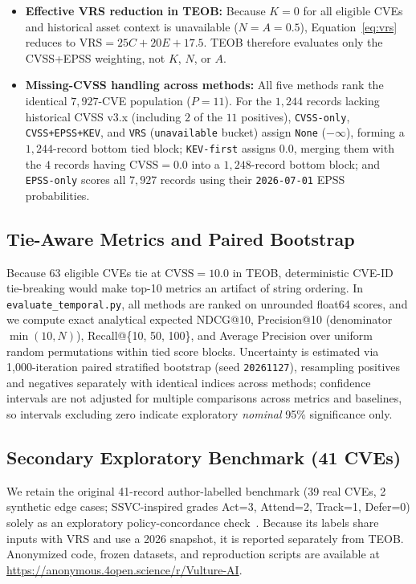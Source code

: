 \documentclass[conference]{IEEEtran}
\begin{document}
\begin{itemize}
    \item \textbf{Effective VRS reduction in TEOB:} Because $K=0$ for all eligible CVEs and historical asset context is unavailable ($N=A=0.5$), Equation~\ref{eq:vrs} reduces to $\text{VRS} = 25C + 20E + 17.5$. TEOB therefore evaluates only the CVSS+EPSS weighting, not $K$, $N$, or $A$.
    \item \textbf{Missing-CVSS handling across methods:} All five methods rank the identical $7{,}927$-CVE population ($P=11$). For the $1{,}244$ records lacking historical CVSS v3.x (including $2$ of the $11$ positives), \texttt{CVSS-only}, \texttt{CVSS+EPSS+KEV}, and \texttt{VRS} (\texttt{unavailable} bucket) assign \texttt{None} ($-\infty$), forming a $1{,}244$-record bottom tied block; \texttt{KEV-first} assigns $0.0$, merging them with the $4$ records having $\text{CVSS}=0.0$ into a $1{,}248$-record bottom block; and \texttt{EPSS-only} scores all $7{,}927$ records using their \texttt{2026-07-01} EPSS probabilities.
\end{itemize}

\subsection{Tie-Aware Metrics and Paired Bootstrap}
Because 63 eligible CVEs tie at $\text{CVSS}=10.0$ in TEOB, deterministic CVE-ID tie-breaking would make top-10 metrics an artifact of string ordering. In \texttt{evaluate\_temporal.py}, all methods are ranked on unrounded float64 scores, and we compute exact analytical expected NDCG@10, Precision@10 (denominator $\min(10, N)$), Recall@\{10, 50, 100\}, and Average Precision over uniform random permutations within tied score blocks. Uncertainty is estimated via 1,000-iteration paired stratified bootstrap (seed \texttt{20261127}), resampling positives and negatives separately with identical indices across methods; confidence intervals are not adjusted for multiple comparisons across metrics and baselines, so intervals excluding zero indicate exploratory \emph{nominal} 95\% significance only.

\subsection{Secondary Exploratory Benchmark (41 CVEs)}
We retain the original 41-record author-labelled benchmark (39 real CVEs, 2 synthetic edge cases; SSVC-inspired grades Act=3, Attend=2, Track=1, Defer=0) solely as an exploratory policy-concordance check~\cite{nvd2023}. Because its labels share inputs with VRS and use a 2026 snapshot, it is reported separately from TEOB. Anonymized code, frozen datasets, and reproduction scripts are available at \url{https://anonymous.4open.science/r/Vulture-AI}.
\end{document}

